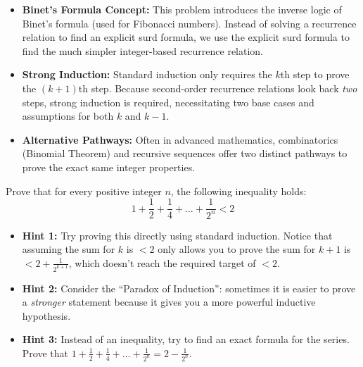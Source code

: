 \begin{takeaways}
\begin{itemize}[leftmargin=*]
    \item \textbf{Binet's Formula Concept:} This problem introduces the inverse logic of Binet's formula (used for Fibonacci numbers). Instead of solving a recurrence relation to find an explicit surd formula, we use the explicit surd formula to find the much simpler integer-based recurrence relation.
    \item \textbf{Strong Induction:} Standard induction only requires the $k$th step to prove the $(k+1)$th step. Because second-order recurrence relations look back \textit{two} steps, strong induction is required, necessitating two base cases and assumptions for both $k$ and $k-1$.
    \item \textbf{Alternative Pathways:} Often in advanced mathematics, combinatorics (Binomial Theorem) and recursive sequences offer two distinct pathways to prove the exact same integer properties.
\end{itemize}
\end{takeaways}

\begin{problem}
Prove that for every positive integer $n$, the following inequality holds:
$$ 1 + \frac{1}{2} + \frac{1}{4} + \dots + \frac{1}{2^n} < 2 $$
\end{problem}

\begin{hint}
\begin{itemize}
    \item \textbf{Hint 1:} Try proving this directly using standard induction. Notice that assuming the sum for $k$ is $< 2$ only allows you to prove the sum for $k+1$ is $< 2 + \frac{1}{2^{k+1}}$, which doesn't reach the required target of $< 2$.
    \item \textbf{Hint 2:} Consider the ``Paradox of Induction'': sometimes it is easier to prove a \textit{stronger} statement because it gives you a more powerful inductive hypothesis.
    \item \textbf{Hint 3:} Instead of an inequality, try to find an exact formula for the series. Prove that $1 + \frac{1}{2} + \frac{1}{4} + \dots + \frac{1}{2^n} = 2 - \frac{1}{2^n}$.
\end{itemize}
\end{hint}

